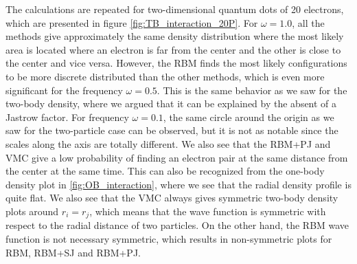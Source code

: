 The calculations are repeated for two-dimensional quantum dots of 20 electrons, which are presented in figure \eqref{fig:TB_interaction_20P}. For $\omega=1.0$, all the methods give approximately the same density distribution where the most likely area is located where an electron is far from the center and the other is close to the center and vice versa. However, the RBM finds the most likely configurations to be more discrete distributed than the other methods, which is even more significant for the frequency $\omega=0.5$. This is the same behavior as we saw for the two-body density, where we argued that it can be explained by the absent of a Jastrow factor. For frequency $\omega=0.1$, the same circle around the origin as we saw for the two-particle case can be observed, but it is not as notable since the scales along the axis are totally different. We also see that the RBM+PJ and VMC give a low probability of finding an electron pair at the same distance from the center at the same time. This can also be recognized from the one-body density plot in \eqref{fig:OB_interaction}, where we see that the radial density profile is quite flat. We also see that the VMC always gives symmetric two-body density plots around $r_i=r_j$, which means that the wave function is symmetric with respect to the radial distance of two particles. On the other hand, the RBM wave function is not necessary symmetric, which results in non-symmetric plots for RBM, RBM+SJ and RBM+PJ. 

